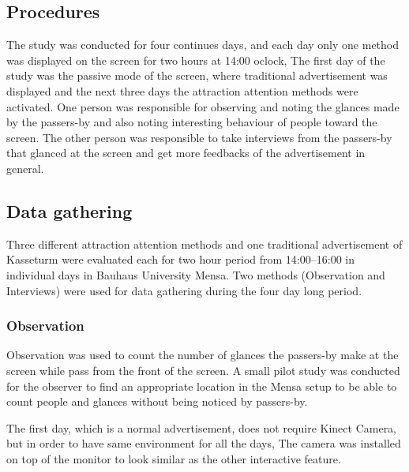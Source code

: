 \subsection{Procedures}
The study was conducted for four continues days, and each day only one method was displayed on the screen for two hours at 14:00 oclock, The first day of the study was the passive mode of the screen, where traditional advertisement was displayed and the next three days the attraction attention methods were activated.
One person was responsible for observing and noting the glances made by the passers-by and also noting interesting behaviour of people toward the screen. The other person was responsible to take interviews from the passers-by that glanced at the screen and get more feedbacks of the advertisement in general.

\subsection{Data gathering}
Three different attraction attention methods and one traditional advertisement of Kasseturm were evaluated each for two hour period from 14:00--16:00 in individual days in Bauhaus University Mensa. Two methods (Observation and Interviews) were used for data gathering during the four day long period.

\subsubsection{Observation}
Observation was used to count the number of glances the passers-by make at the screen while pass from the front of the screen. A small pilot study was conducted for the observer to find an appropriate location in the Mensa setup to be able to count people and glances without being noticed by passers-by.

The first day, which is a normal advertisement, does not require Kinect Camera, but in order to have same environment for all the days, The camera was installed on top of the monitor to look similar as the other interactive feature.


